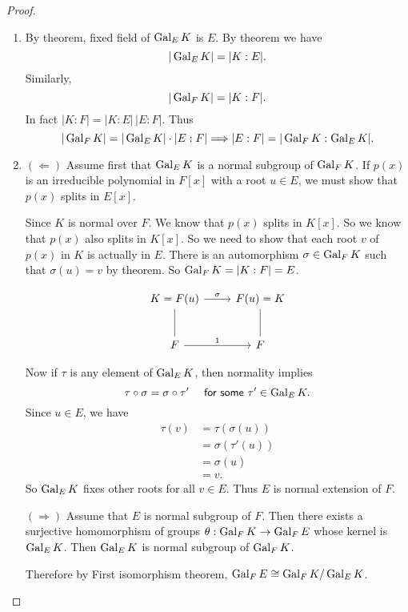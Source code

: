 \begin{proof}
    \begin{enumerate}
        \item By theorem, fixed field of $\operatorname{Gal}_E K$ is $E$. By theorem we have 
        \[
            |\operatorname{Gal}_E K| = |K:E|.
        \]
        Similarly,
        \[
            |\operatorname{Gal}_F K| = |K:F|.
        \]
        In fact $|K:F| = |K:E|\,|E:F|$. Thus 
        \[
            |\operatorname{Gal}_F K| = |\operatorname{Gal}_E K| \cdot |E:F| \Longrightarrow |E:F| = |\operatorname{Gal}_F K: \operatorname{Gal}_E K|. 
        \]

        \item $(\Leftarrow)$ Assume first that $\operatorname{Gal}_E K$ is a normal subgroup of $\operatorname{Gal}_F K$. If $p(x)$ 
        is an irreducible polynomial in $F[x]$ with a root $u \in E$, we must show that $p(x)$ splits in $E[x]$.

        Since $K$ is normal over $F$. We know that $p(x)$ splits in $K[x]$. So we know that $p(x)$ also splits 
        in $K[x]$. So we need to show that each root $v$ of $p(x)$ in $K$ is actually in $E$. There is an automorphism 
        $\sigma \in \operatorname{Gal}_F K$ such that $\sigma(u) = v$ by theorem. So $\operatorname{Gal}_F K = |K:F| = E$.

        \[
            \begin{tikzcd}[row sep=2.5em]
                K=F(u) \arrow[r, "\sigma"] \arrow[dash]{d} & F(u) = K \arrow[dash]{d}\\
                F \arrow[r, "1"] & F
            \end{tikzcd}
        \]

        Now if $\tau$ is any element of $\operatorname{Gal}_E K$, then normality implies 
        \[
            \tau \circ \sigma = \sigma \circ \tau' \quad \textsf{ for some } \tau' \in \operatorname{Gal}_E K.
        \]
        Since $u \in E$, we have 
        \begin{align*}
            \tau(v) &= \tau \left( \sigma(u) \right)\\
            &= \sigma \left( \tau'(u) \right)\\
            &= \sigma(u)\\ 
            &= v.
        \end{align*}
        So $\operatorname{Gal}_E K$ fixes other roots for all $v \in E$. Thus $E$ is normal extension of $F$.

        $(\Rightarrow)$ Assume that $E$ is normal subgroup of $F$. Then there exists a surjective 
        homomorphism of groups $\theta: \operatorname{Gal}_F K \to \operatorname{Gal}_F E$ whose kernel is 
        $\operatorname{Gal}_E K$. Then $\operatorname{Gal}_E K$ is normal subgroup of $\operatorname{Gal}_F K$. 

        Therefore by First isomorphism theorem, $\operatorname{Gal}_F E \cong \operatorname{Gal}_F K / \operatorname{Gal}_E K$.
    \end{enumerate}
\end{proof}

